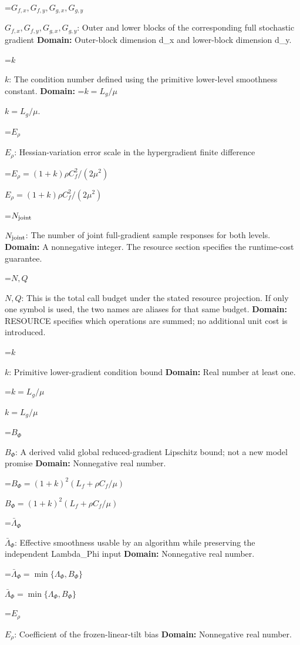 \documentclass[10pt,a4paper]{article}
\newcommand{\AtlasMath}[1]{\par\begingroup\centering\setbox0=\hbox{$\displaystyle #1$}\ifdim\wd0>1.4\linewidth\typeout{ATLAS WIDE FORMULA: \the\wd0}\fi\ifdim\wd0>\linewidth\resizebox{\linewidth}{!}{\box0}\else\box0\fi\par\endgroup}
\newcommand{\AtlasInlineMath}[1]{\begingroup\setbox0=\hbox{$#1$}\ifdim\wd0>.4\linewidth\endgroup\AtlasMath{#1}\else\endgroup$#1$\fi}
\begin{document}
\AtlasInlineMath{G_{f,x},G_{f,y},G_{g,x},G_{g,y}}: Outer and lower blocks of the corresponding full stochastic gradient \textbf{Domain:} Outer-block dimension d\_x and lower-block dimension d\_y.



\AtlasInlineMath{k}: The condition number defined using the primitive lower-level smoothness constant. \textbf{Domain:} \AtlasInlineMath{k=L_g/\mu}.



\AtlasInlineMath{E_\rho}: Hessian-variation error scale in the hypergradient finite difference



\AtlasInlineMath{E_\rho=(1+k)\rho C_f^2/(2\mu^2)}



\AtlasInlineMath{N_{\rm joint}}: The number of joint full-gradient sample responses for both levels. \textbf{Domain:} A nonnegative integer. The resource section specifies the runtime-cost guarantee.



\AtlasInlineMath{N,Q}: This is the total call budget under the stated resource projection. If only one symbol is used, the two names are aliases for that same budget. \textbf{Domain:} RESOURCE specifies which operations are summed; no additional unit cost is introduced.



\AtlasInlineMath{k}: Primitive lower-gradient condition bound \textbf{Domain:} Real number at least one.



\AtlasInlineMath{k=L_g/\mu}



\AtlasInlineMath{B_\Phi}: A derived valid global reduced-gradient Lipschitz bound; not a new model promise \textbf{Domain:} Nonnegative real number.



\AtlasInlineMath{B_\Phi=(1+k)^2(L_f+\rho C_f/\mu)}



\AtlasInlineMath{\bar\Lambda_\Phi}: Effective smoothness usable by an algorithm while preserving the independent Lambda\_Phi input \textbf{Domain:} Nonnegative real number.



\AtlasInlineMath{\bar\Lambda_\Phi=\min\{\Lambda_\Phi,B_\Phi\}}



\AtlasInlineMath{E_\rho}: Coefficient of the frozen-linear-tilt bias \textbf{Domain:} Nonnegative real number.
\end{document}
